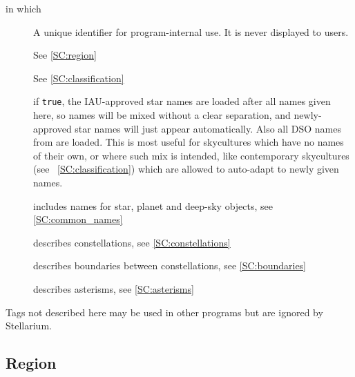 in which
\begin{description}
\item[] A unique identifier for program-internal use. It is never displayed to users. 
\item[] See \ref{SC:region}
\item[] See \ref{SC:classification}
\item[] if \texttt{true}, the IAU-approved star names are loaded after all names given here, 
so names will be mixed without a clear separation, and newly-approved star names will just appear automatically. 
Also all DSO names from  are loaded.
This is most useful for skycultures which have no names of their own, or where such mix is intended, 
like  contemporary skycultures (see ~\ref{SC:classification}) which are allowed to auto-adapt to newly given names. 
\item[] includes names for star, planet and deep-sky objects, see \ref{SC:common_names}
\item[] describes constellations, see \ref{SC:constellations}
\item[] describes boundaries between constellations, see \ref{SC:boundaries}
\item[]  describes asterisms, see \ref{SC:asterisms}
\end{description}

Tags not described here may be used in other programs but are ignored by Stellarium.

\subsection{Region}
\label{sec:skycultures:region}
\label{SC:region}

